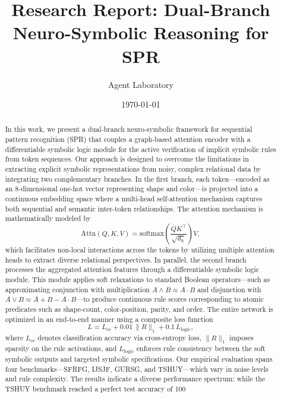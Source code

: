\documentclass[11pt]{article}
\title{Research Report: Dual-Branch Neuro-Symbolic Reasoning for SPR}
\author{Agent Laboratory}
\date{\today}
\begin{document}
\maketitle

\begin{abstract}
In this work, we present a dual‐branch neuro‐symbolic framework for sequential pattern recognition (SPR) that couples a graph‐based attention encoder with a differentiable symbolic logic module for the active verification of implicit symbolic rules from token sequences. Our approach is designed to overcome the limitations in extracting explicit symbolic representations from noisy, complex relational data by integrating two complementary branches. In the first branch, each token—encoded as an 8‐dimensional one‐hot vector representing shape and color—is projected into a continuous embedding space where a multi‐head self-attention mechanism captures both sequential and semantic inter-token relationships. The attention mechanism is mathematically modeled by 
\[
\mathrm{Attn}(Q,K,V) = \mathrm{softmax}\left(\frac{QK^\top}{\sqrt{d_k}}\right)V,
\]
which facilitates non-local interactions across the tokens by utilizing multiple attention heads to extract diverse relational perspectives. In parallel, the second branch processes the aggregated attention features through a differentiable symbolic logic module. This module applies soft relaxations to standard Boolean operators—such as approximating conjunction with multiplication \(A \wedge B \approx A \cdot B\) and disjunction with \(A \vee B \approx A + B - A \cdot B\)—to produce continuous rule scores corresponding to atomic predicates such as shape-count, color-position, parity, and order. The entire network is optimized in an end-to-end manner using a composite loss function
\[
L = L_{\mathrm{ce}} + 0.01\,\|R\|_1 + 0.1\,L_{\mathrm{logic}},
\]
where \(L_{\mathrm{ce}}\) denotes classification accuracy via cross-entropy loss, \(\|R\|_1\) imposes sparsity on the rule activations, and \(L_{\mathrm{logic}}\) enforces rule consistency between the soft symbolic outputs and targeted symbolic specifications. Our empirical evaluation spans four benchmarks—SFRFG, IJSJF, GURSG, and TSHUY—which vary in noise levels and rule complexity. The results indicate a diverse performance spectrum: while the TSHUY benchmark reached a perfect test accuracy of 100%
\end{abstract}
\end{document}
